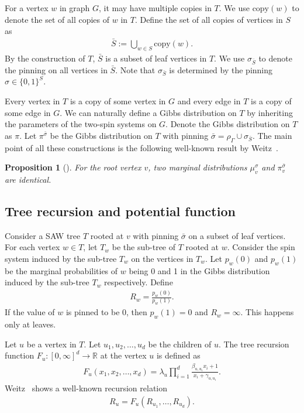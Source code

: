 \documentclass[11pt]{amsart}
\newcommand{\defeq}{:=}
\newtheorem{proposition}[theorem]{Proposition}
\theoremstyle{definition}
\theoremstyle{remark}
\begin{document}
For a vertex $w$ in graph $G$, it may have multiple copies in $T$. We use $\text{copy}(w)$ to denote the set of all copies of $w$ in $T$.
Define the set of all copies of vertices in $S$ as
\begin{align}\label{eq:lambda}
  \bar{S} \defeq \bigcup_{w \in S} \text{copy}(w).
\end{align}
By the construction of $T$, $\bar{S}$ is a subset of leaf vertices in $T$. We use $\sigma_{\bar{S}}$ to denote the pinning on all vertices in $\bar{S}$. 
Note that $\sigma_{\bar{S}}$ is determined by the pinning $\sigma \in \{0,1\}^S$.

Every vertex in $T$ is a copy of some vertex in $G$ and every edge in $T$ is a copy of some edge in $G$. We can naturally define a Gibbs distribution on $T$ by inheriting the parameters of the two-spin systems on $G$. Denote the Gibbs distribution on $T$ as $\pi$. 
Let $\pi^{\bar{\sigma}}$ be the Gibbs distribution on $T$ with pinning $\bar{\sigma} = \rho_\Gamma \cup \sigma_{\bar{S}}$.  
The main point of all these constructions is the following well-known result by Weitz~\cite{weitz2006counting}. 
    
 \begin{proposition}[]\label{prop:marginal-distributions-are-identical}   
    For the root vertex $v$, two marginal distributions $\mu_v^\sigma$ and $\pi_v^{\bar{\sigma}}$ are identical. 
\end{proposition}

\subsection{Tree recursion and potential function}
Consider a SAW tree $T$ rooted at $v$ with pinning $\bar{\sigma}$ on a subset of leaf vertices. For each vertex $w \in T$, let $T_w$ be the sub-tree of $T$ rooted at $w$.
Consider the spin system induced by the sub-tree $T_w$ on the vertices in $T_w$.
Let $p_w(0)$ and $p_w(1)$ be the marginal probabilities of $w$ being 0 and 1 in the Gibbs distribution induced by the sub-tree $T_w$ respectively. Define
\begin{align}\label{eq:R-w}
    R_w = \frac{p_w(0)}{p_w(1)}.
\end{align}
If the value of $w$ is pinned to be 0, then $p_w(1) = 0$ and $R_w = \infty$. This happens only at leaves. 

Let $u$ be a vertex in $T$. Let $u_1,u_2,\ldots,u_d$ be the children of $u$. The tree recursion function $F_u: [0,\infty]^d \to \mathbb{R}$ at the vertex $u$ is defined as
\begin{align}\label{eq:tree-recursion}
F_u(x_1,x_2,\ldots,x_d) = \lambda_u \prod_{i=1}^d \frac{\beta_{u,u_i} x_i +1}{x_i+\gamma_{u,u_i}}.
\end{align}
Weitz~\cite{weitz2006counting} shows a well-known recursion relation 
\begin{align*}
    R_u = F_u(R_{u_1},\ldots,R_{u_d}).
\end{align*}
\end{document}
